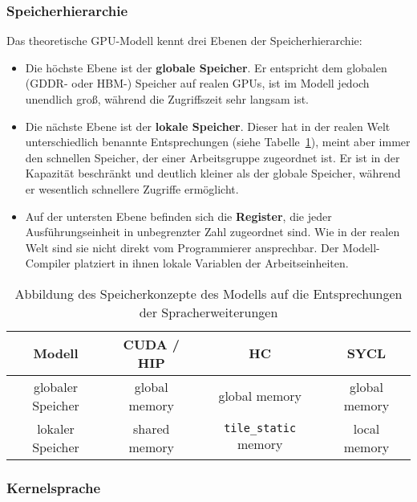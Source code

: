\subsubsection{Speicherhierarchie}
\label{methoden:konzepte:speicher}

Das theoretische GPU-Modell kennt drei Ebenen der Speicherhierarchie:

\begin{itemize}
    \item Die höchste Ebene ist der \textbf{globale Speicher}. Er entspricht dem
          globalen (GDDR- oder HBM-) Speicher auf realen GPUs, ist im Modell
          jedoch unendlich groß, während die Zugriffszeit sehr langsam ist.
    \item Die nächste Ebene ist der \textbf{lokale Speicher}. Dieser hat in der
          realen Welt unterschiedlich benannte Entsprechungen
          (siehe Tabelle~\ref{methoden:konzepte:speicher:tabelle}), meint aber
          immer den schnellen Speicher, der einer Arbeitsgruppe zugeordnet ist.
          Er ist in der Kapazität beschränkt und deutlich kleiner als der
          globale Speicher, während er wesentlich schnellere Zugriffe
          ermöglicht.
    \item Auf der untersten Ebene befinden sich die \textbf{Register}, die jeder
          Ausführungseinheit in unbegrenzter Zahl zugeordnet sind. Wie in der
          realen Welt sind sie nicht direkt vom Programmierer ansprechbar. Der
          Modell-Compiler platziert in ihnen lokale Variablen der
          Arbeitseinheiten.
\end{itemize}

\begin{table}[htb]
    \centering
    \begin{tabular}{|c|c|c|c|}
        \hline
        Modell & CUDA / HIP & HC & SYCL\\ \hline
        globaler Speicher & global memory & global memory & global memory\\
        \hline
        lokaler Speicher & shared memory & \texttt{tile\_static} memory &
        local memory \\
        \hline
    \end{tabular}
    \caption{Abbildung des Speicherkonzepte des Modells auf die Entsprechungen
             der Spracherweiterungen}
    \label{methoden:konzepte:speicher:tabelle}
\end{table}

\subsubsection{Kernelsprache}

